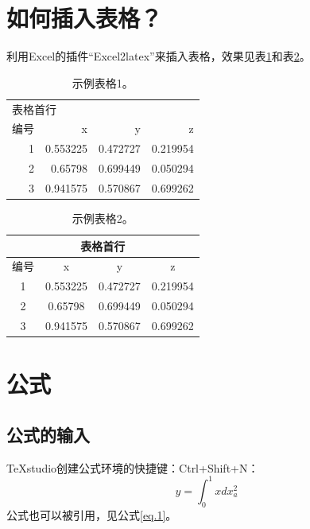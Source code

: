 \documentclass[]{article}	%
\begin{document}
\clearpage
\section{如何插入表格？}

利用Excel的插件``Excel2latex''来插入表格，效果见表\ref{tab.1}和表\ref{tab.2}。
\begin{table}[htbp]
	\centering
	\caption{示例表格1。}
	\begin{tabular}{rrrr} %
		\multicolumn{4}{l}{表格首行} \\	%
		编号    & x     & y     & z \\	%
		1     & 0.553225 & 0.472727 & 0.219954 \\	%
		2     & 0.65798 & 0.699449 & 0.050294 \\
		3     & 0.941575 & 0.570867 & 0.699262 \\
	\end{tabular}%
	\label{tab.1}%
\end{table}%

\begin{table}[htbp]
	\centering
	\caption{示例表格2。}
	\begin{tabular}{|c|c|c|c|}
		\toprule 
		\multicolumn{4}{|c|}{表格首行} \\
		\midrule
		编号    & x     & y     & z \\
		\midrule
		1     & 0.553225 & 0.472727 & 0.219954 \\
		\midrule
		2     & 0.65798 & 0.699449 & 0.050294 \\
		\midrule
		3     & 0.941575 & 0.570867 & 0.699262 \\
		\bottomrule
	\end{tabular}%
	\label{tab.2}%
\end{table}%

\clearpage
\section{公式}	%

\subsection{公式的输入}

TeXstudio创建公式环境的快捷键：Ctrl+Shift+N：
\begin{equation}\label{eq.1}
	y = \int_{0}^{1} x dx^{2}_{a}
\end{equation}
公式也可以被引用，见公式\eqref{eq.1}。
\end{document}
